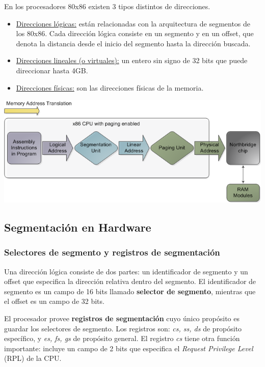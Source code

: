 En los procesadores 80x86 existen 3 tipos distintos de direcciones.

\begin{itemize}
 \item \underline{Direcciones l\'ogicas:} est\'an relacionadas con la arquitectura de segmentos de los 80x86. Cada direcci\'on l\'ogica consiste
 en un segmento y en un offset, que denota la distancia desde el inicio del segmento hasta la direcci\'on buscada.
 \item \underline{Direcciones lineales (o virtuales):} un entero sin signo de 32 bits que puede direccionar hasta 4GB.
 \item \underline{Direcciones f\'isicas:} son las direcciones f\'isicas de la memoria.
\end{itemize}

\begin{center}
\includegraphics[scale=0.5]{./Graficos/direccionamiento_memoria.png} 
\end{center}

\subsection{Segmentaci\'on en Hardware}

\subsubsection{Selectores de segmento y registros de segmentaci\'on}

Una direcci\'on l\'ogica consiste de dos partes: un identificador de segmento y un offset que especifica la direcci\'on relativa 
dentro del segmento. El identificador de segmento es un campo de 16 bits llamado \textbf{selector de segmento}, mientras que el offset
es un campo de 32 bits.

El procesador provee \textbf{registros de segmentaci\'on} cuyo \'unico prop\'osito es guardar los selectores de segmento. Los registros son:
\textit{cs, ss, ds} de prop\'osito espec\'ifico, y \textit{es, fs, gs} de prop\'osito general. El registro \textit{cs} tiene otra funci\'on
importante: incluye un campo de 2 bits que especifica el \textit{Request Privilege Level} (RPL) de la CPU.

